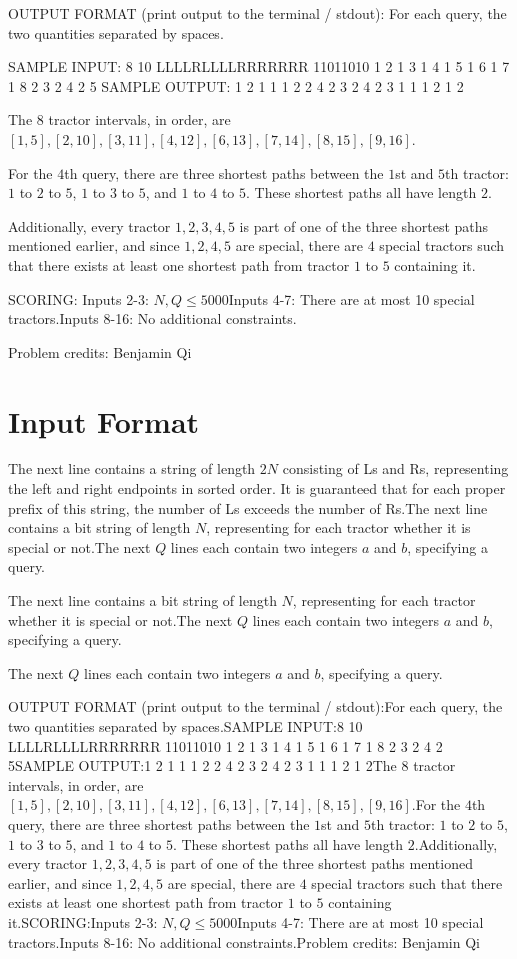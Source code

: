 \documentclass[12pt]{article}
\begin{document}
OUTPUT FORMAT (print output to the terminal / stdout):
For each query, the two quantities separated by spaces.

SAMPLE INPUT:
8 10
LLLLRLLLLRRRRRRR
11011010
1 2
1 3
1 4
1 5
1 6
1 7
1 8
2 3
2 4
2 5
SAMPLE OUTPUT: 
1 2
1 1
1 2
2 4
2 3
2 4
2 3
1 1
1 2
1 2

The $8$ tractor intervals, in order, are
$[1, 5], [2, 10], [3, 11], [4, 12], [6, 13], [7, 14], [8, 15], [9, 16]$. 

For the $4$th query, there are three shortest paths between the $1$st and $5$th
tractor:  $1$ to $2$ to $5$, $1$ to $3$ to $5$, and $1$ to $4$ to $5$. These
shortest paths all have length $2$.

Additionally, every tractor $1,2,3,4,5$ is part of one of the three shortest
paths mentioned earlier, and since $1,2,4,5$ are special, there are $4$ special
tractors such that there exists at least one shortest path from tractor $1$ to
$5$ containing it.

SCORING:
Inputs 2-3: $N,Q\le 5000$Inputs 4-7: There are at most 10 special tractors.Inputs 8-16: No additional constraints.


Problem credits: Benjamin Qi



\section*{Input Format}
The next line contains a string of length $2N$ consisting of Ls and Rs,
representing the left and right endpoints in sorted order. It is guaranteed that
for each proper prefix of this string, the number of Ls exceeds the number of
Rs.The next line contains a bit string of length $N$, representing for each
tractor whether it is special or not.The next $Q$ lines each contain two integers $a$ and $b$, specifying a query.

The next line contains a bit string of length $N$, representing for each
tractor whether it is special or not.The next $Q$ lines each contain two integers $a$ and $b$, specifying a query.

The next $Q$ lines each contain two integers $a$ and $b$, specifying a query.

OUTPUT FORMAT (print output to the terminal / stdout):For each query, the two quantities separated by spaces.SAMPLE INPUT:8 10
LLLLRLLLLRRRRRRR
11011010
1 2
1 3
1 4
1 5
1 6
1 7
1 8
2 3
2 4
2 5SAMPLE OUTPUT:1 2
1 1
1 2
2 4
2 3
2 4
2 3
1 1
1 2
1 2The $8$ tractor intervals, in order, are
$[1, 5], [2, 10], [3, 11], [4, 12], [6, 13], [7, 14], [8, 15], [9, 16]$.For the $4$th query, there are three shortest paths between the $1$st and $5$th
tractor:  $1$ to $2$ to $5$, $1$ to $3$ to $5$, and $1$ to $4$ to $5$. These
shortest paths all have length $2$.Additionally, every tractor $1,2,3,4,5$ is part of one of the three shortest
paths mentioned earlier, and since $1,2,4,5$ are special, there are $4$ special
tractors such that there exists at least one shortest path from tractor $1$ to
$5$ containing it.SCORING:Inputs 2-3: $N,Q\le 5000$Inputs 4-7: There are at most 10 special tractors.Inputs 8-16: No additional constraints.Problem credits: Benjamin Qi
\end{document}
